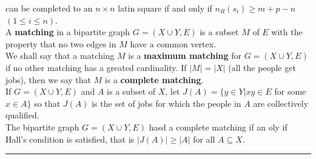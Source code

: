 \documentclass[10pt,landscape]{article}
\begin{document}
\begin{multicols}{4}
can be completed to an $n \times n$ latin square if and only if
$n_{R}(s_{i}) \geq m + p - n$ $(1 \leq i \leq n)$.\\
A \textbf{matching} in a bipartite graph $G = (X \cup Y, E)$ is a
subset $M$ of $E$ with the property that no two edges in $M$ have a
common vertex.\\
We shall say that a matching $M$ is a \textbf{maximum matching} for $G
=(X \cup Y,E)$ if no other matching has a greated cardinality. If $|M|
= |X|$ (all the people get jobs), then we say that $M$ is a
\textbf{complete matching}.\\
If $G = (X \cup Y, E)$ and $A$ is a subset of $X$, let $J(A) = \{y \in
Y | xy \in E$ for some $x \in A\}$ so that $J(A)$ is the set of jobs
for which the people in $A$ are collectively qualified.\\
The bipartite graph $G = (X \cup Y, E)$ hasd a complete matching if an
oly if Hall's condition is satisfied, that is $|J(A)| \geq |A|$ for
all $A \subseteq X$.\\ 




\rule{0.3\linewidth}{0.25pt}
\scriptsize


\end{multicols}
\end{document}
